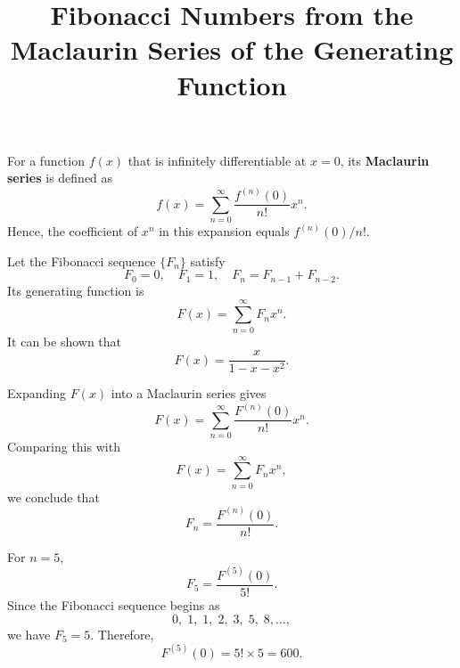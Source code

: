 \documentclass[a4paper,12pt]{article}
\title{Fibonacci Numbers from the Maclaurin Series of the Generating Function}
\author{}
\date{}
\begin{document}
\maketitle

For a function \( f(x) \) that is infinitely differentiable at \( x=0 \),
its \textbf{Maclaurin series} is defined as
\[
f(x) = \sum_{n=0}^{\infty} \frac{f^{(n)}(0)}{n!} x^n.
\]
Hence, the coefficient of \(x^n\) in this expansion equals \( f^{(n)}(0)/n! \).

Let the Fibonacci sequence \(\{F_n\}\) satisfy
\[
F_0 = 0, \quad F_1 = 1, \quad F_{n} = F_{n-1} + F_{n-2}.
\]
Its generating function is
\[
F(x) = \sum_{n=0}^{\infty} F_n x^n.
\]
It can be shown that
\[
F(x) = \frac{x}{1 - x - x^2}.
\]

Expanding \(F(x)\) into a Maclaurin series gives
\[
F(x) = \sum_{n=0}^{\infty} \frac{F^{(n)}(0)}{n!} x^n.
\]
Comparing this with
\[
F(x) = \sum_{n=0}^{\infty} F_n x^n,
\]
we conclude that
\[
F_n = \frac{F^{(n)}(0)}{n!}.
\]

For \( n = 5 \),
\[
F_5 = \frac{F^{(5)}(0)}{5!}.
\]
Since the Fibonacci sequence begins as
\[
0, \; 1, \; 1, \; 2, \; 3, \; 5, \; 8, \dots,
\]
we have \(F_5 = 5\). Therefore,
\[
F^{(5)}(0) = 5! \times 5 = 600.
\]
\end{document}
